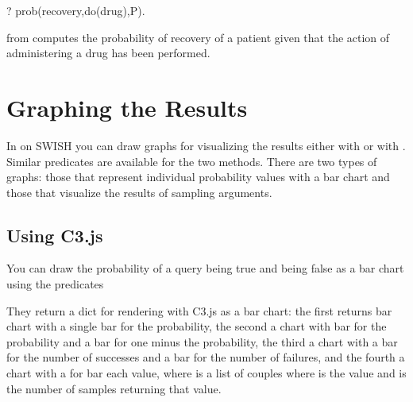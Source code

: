 \documentclass[letterpaper,10pt,english]{sphinxmanual}
\begin{document}
\begin{sphinxVerbatim}[commandchars=\\\{\}]
?\PYGZhy{} prob(recovery,do(drug),P).
\end{sphinxVerbatim}

from  computes the probability of recovery of a patient given that the action of administering a drug has been performed.


\section{Graphing the Results}
\label{\detokenize{index:graphing-the-results}}
In  on SWISH you can draw graphs for visualizing the results either with  or with .
Similar predicates are available for the two methods.
There are two types of graphs: those that represent individual probability values with a bar chart and those that visualize the results of sampling arguments.


\subsection{Using C3.js}
\label{\detokenize{index:using-c3-js}}
You can draw the probability of a query being true and being false as a bar chart using the predicates

\begin{sphinxVerbatim}[commandchars=\\\{\}]
  
  
  
  
\end{sphinxVerbatim}

They return a dict for rendering with C3.js as a bar chart: the first returns bar chart with a single bar for the probability, the second a chart with bar for the probability and a bar for one minus the probability, the third a chart with a bar for the number of successes and a bar for the number of failures, and the fourth a chart with a for bar each value, where  is a list of couples  where  is the value and  is the number of samples returning that value.
\end{document}
